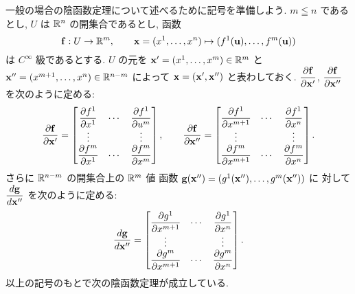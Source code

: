 \documentclass[12pt,twoside]{jarticle}
\begin{document}
一般の場合の陰函数定理について述べるために記号を準備しよう.
$m\leqq n$ であるとし, %
$U$ は ${\mathbb R}^n$ の開集合であるとし, 函数
\begin{equation*}
 {\mathbf f}:U\to {\mathbb R}^m, \qquad
 {\mathbf x}=(x^1,\ldots,x^n) \mapsto (f^1({\mathbf u}),\ldots,f^m({\mathbf u}))
\end{equation*}
は $C^\infty$ 級であるとする. 
$U$ の元を ${\mathbf x}'=(x^1,\ldots,x^m)\in{\mathbb R}^m$ 
と ${\mathbf x}''=(x^{m+1},\ldots,x^n)\in{\mathbb R}^{n-m}$ 
によって ${\mathbf x}=({\mathbf x}',{\mathbf x}'')$ と表わしておく.
$\dfrac{\partial{\mathbf f}}{\partial{\mathbf x}'}$, $\dfrac{\partial{\mathbf f}}{\partial{\mathbf x}''}$ を次のように定める:
\begin{equation*}
 \dfrac{\partial{\mathbf f}}{\partial{\mathbf x}'}=
  \begin{bmatrix}
   \dfrac{\partial f^1}{\partial x^1} & \cdots & \dfrac{\partial f^1}{\partial u^m} \\
   \vdots                 &        & \vdots \\
   \dfrac{\partial f^m}{\partial x^1} & \cdots & \dfrac{\partial f^m}{\partial x^m} \\
  \end{bmatrix},
  \qquad
 \dfrac{\partial{\mathbf f}}{\partial{\mathbf x}''}=
  \begin{bmatrix}
   \dfrac{\partial f^1}{\partial x^{m+1}} & \cdots & \dfrac{\partial f^1}{\partial x^n} \\
   \vdots                     &        & \vdots \\
   \dfrac{\partial f^m}{\partial x^{m+1}} & \cdots & \dfrac{\partial f^m}{\partial x^n} \\
  \end{bmatrix}.
\end{equation*}
さらに ${\mathbb R}^{n-m}$ の開集合上の ${\mathbb R}^m$ 値
函数 ${\mathbf g}({\mathbf x}'')=(g^1({\mathbf x}''),\ldots,g^m({\mathbf x}''))$ に
対して $\dfrac{d{\mathbf g}}{d{\mathbf x}''}$ を次のように定める:
\begin{equation*}
 \dfrac{d{\mathbf g}}{d{\mathbf x}''}=
  \begin{bmatrix}
   \dfrac{\partial g^1}{\partial x^{m+1}} & \cdots & \dfrac{\partial g^1}{\partial x^n} \\
   \vdots                     &        & \vdots \\
   \dfrac{\partial g^m}{\partial x^{m+1}} & \cdots & \dfrac{\partial g^m}{\partial x^n} \\
  \end{bmatrix}.
\end{equation*}
以上の記号のもとで次の陰函数定理が成立している.
\end{document}
